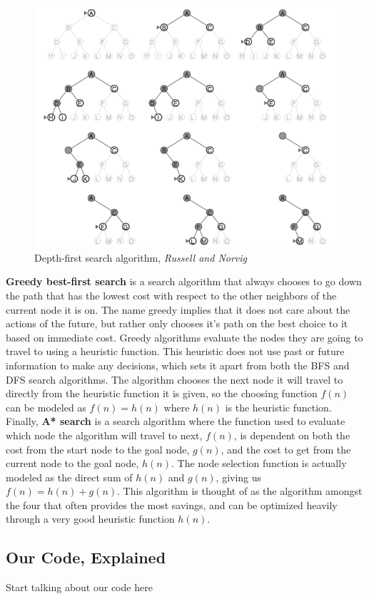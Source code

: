 \documentclass[titlepage]{article}
\begin{document}
\newpage

\begin{figure}[h!]
\includegraphics[width=\linewidth]{dfs.png}
\caption{Depth-first search algorithm, \textit{Russell and Norvig}}
\label{fig:DFSdiagram1}
\end{figure}

\noindent
\textbf{Greedy best-first search} is a search algorithm that always chooses to go down the path that has the lowest cost with respect to the other neighbors of the current node it is on. The name greedy implies that it does not care about the actions of the future, but rather only chooses it's path on the best choice to it based on immediate cost. Greedy algorithms evaluate the nodes they are going to travel to using a heuristic function. This heuristic does not use past or future information to make any decisions, which sets it apart from both the BFS and DFS search algorithms. The algorithm chooses the next node it will travel to directly from the heuristic function it is given, so the choosing function \(f(n)\) can be modeled as \(f(n) = h(n)\) where \(h(n)\) is the heuristic function.\newline
\newline
Finally, \textbf{A* search} is a search algorithm where the function used to evaluate which node the algorithm will travel to next, \(f(n)\), is dependent on both the cost from the start node to the goal node, \(g(n)\), and the cost to get from the current node to the goal node, \(h(n)\). The node selection function is actually modeled as the direct sum of \(h(n)\) and \(g(n)\), giving us \(f(n) = h(n) + g(n)\). This algorithm is thought of as the algorithm amongst the four that often provides the most savings, and can be optimized heavily through a very good heuristic function \(h(n)\).

\subsection{Our Code, Explained}
Start talking about our code here
\end{document}

